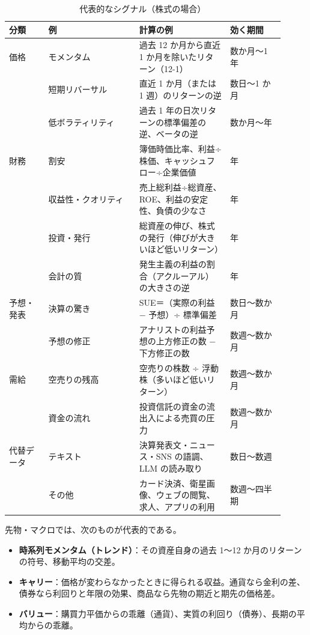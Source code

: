 \begin{table}[H]
\centering\small
\caption{代表的なシグナル（株式の場合）}
\label{tab:signals}
\begin{tabular}{@{}P{0.13\linewidth}P{0.3\linewidth}P{0.3\linewidth}P{0.18\linewidth}@{}}
\toprule
分類 & 例 & 計算の例 & 効く期間 \\
\midrule
価格 & モメンタム & 過去 12 か月から直近 1 か月を除いたリターン（12-1） & 数か月〜1 年 \\
 & 短期リバーサル & 直近 1 か月（または 1 週）のリターンの逆 & 数日〜1 か月 \\
 & 低ボラティリティ & 過去 1 年の日次リターンの標準偏差の逆、ベータの逆 & 数か月〜年 \\
\midrule
財務 & 割安 & 簿価時価比率、利益÷株価、キャッシュフロー÷企業価値 & 年 \\
 & 収益性・クオリティ & 売上総利益÷総資産、ROE、利益の安定性、負債の少なさ & 年 \\
 & 投資・発行 & 総資産の伸び、株式の発行（伸びが大きいほど低いリターン） & 年 \\
 & 会計の質 & 発生主義の利益の割合（アクルーアル）の大きさの逆 & 年 \\
\midrule
予想・発表 & 決算の驚き & SUE＝（実際の利益 − 予想）÷ 標準偏差 & 数日〜数か月 \\
 & 予想の修正 & アナリストの利益予想の上方修正の数 − 下方修正の数 & 数週〜数か月 \\
\midrule
需給 & 空売りの残高 & 空売りの株数 ÷ 浮動株（多いほど低いリターン） & 数週〜数か月 \\
 & 資金の流れ & 投資信託の資金の流出入による売買の圧力 & 数週〜数か月 \\
\midrule
代替データ & テキスト & 決算発表文・ニュース・SNS の語調、LLM の読み取り & 数日〜数週 \\
 & その他 & カード決済、衛星画像、ウェブの閲覧、求人、アプリの利用 & 数週〜四半期 \\
\bottomrule
\end{tabular}
\end{table}

先物・マクロでは、次のものが代表的である。

\begin{itemize}
\item \textbf{時系列モメンタム（トレンド）}：その資産自身の過去 1〜12 か月のリターンの符号、移動平均の交差。
\item \textbf{キャリー}：価格が変わらなかったときに得られる収益。通貨なら金利の差、債券なら利回りと年限の効果、商品なら先物の期近と期先の価格差。
\item \textbf{バリュー}：購買力平価からの乖離（通貨）、実質の利回り（債券）、長期の平均からの乖離。
\end{itemize}

